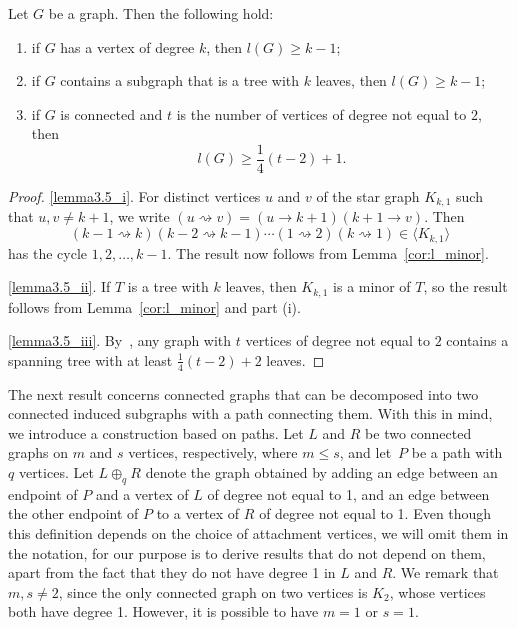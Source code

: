 \documentclass[ALCO,ThmDefs,Unicode,epreuves]{cedram}
\newcommand{\genset}[1]{\langle#1\rangle}
\begin{document}
\begin{lemma} \label{lem:degree}
 Let $G$ be a graph. Then the following hold:
 \begin{enumerate}[(\roman*)]
 \item\label{lemma3.5_i}
 if $G$ has a vertex of degree $k$, then $l(G) \ge k - 1$;
 \item\label{lemma3.5_ii}
 if $G$ contains a subgraph that is a tree with $k$ leaves, then 
 $l(G) \ge k - 1$;
 \item\label{lemma3.5_iii}
 if $G$ is connected and $t$ is the number of vertices of degree not
 equal to $2$, then 
 \[l(G) \ge \frac{1}{4}(t-2) + 1.\]
 \end{enumerate}
\end{lemma}
\begin{proof}
 \ref{lemma3.5_i}.
 For distinct vertices $u$ and $v$ of the star graph $K_{k,1}$ such that $u,
 v\not = k + 1$, we write $(u \rightsquigarrow v) = (u \to k+1) (k+1 \to v)$.
 Then 
 \[
 (k-1\rightsquigarrow k)(k-2\rightsquigarrow
 k-1)\cdots(1\rightsquigarrow2)(k\rightsquigarrow1)\in\genset{K_{k,1}}
 \]
 has the cycle $1,2,\ldots,k-1$. The result now follows from
 Lemma~\ref{cor:l_minor}.

 \ref{lemma3.5_ii}.
 If $T$ is a tree with $k$ leaves, then $K_{k,1}$ is a minor of $T$, so the
 result follows from Lemma~\ref{cor:l_minor} and part (i).

 \ref{lemma3.5_iii}.
 By~\cite{Bankevich2012}, any graph with $t$ vertices of degree not equal to $2$
 contains a spanning tree with at least $\frac{1}{4}(t-2) + 2$ leaves.
\end{proof}

The next result concerns connected graphs that can be decomposed into two
connected induced subgraphs with a path connecting them. With this in mind, we
introduce a construction based on paths. Let $L$ and $R$ be two connected
graphs on $m$ and $s$ vertices, respectively, where $m \le s$, and let~$P$ be a
path with $q$ vertices. Let $L \oplus_q R$ denote the graph obtained by adding
an edge between an endpoint of $P$ and a vertex of $L$ of degree not equal to
1, and an edge between the other endpoint of $P$ to a vertex of $R$ of degree
not equal to 1. Even though this definition depends on the choice of
attachment vertices, we will omit them in the notation, for our purpose is to
derive results that do not depend on them, apart from the fact that they do not
have degree 1 in $L$ and $R$. We remark that $m, s \ne 2$, since the only
connected graph on two vertices is $K_2$, whose vertices both have degree 1.
However, it is possible to have $m=1$ or $s=1$.
\end{document}
